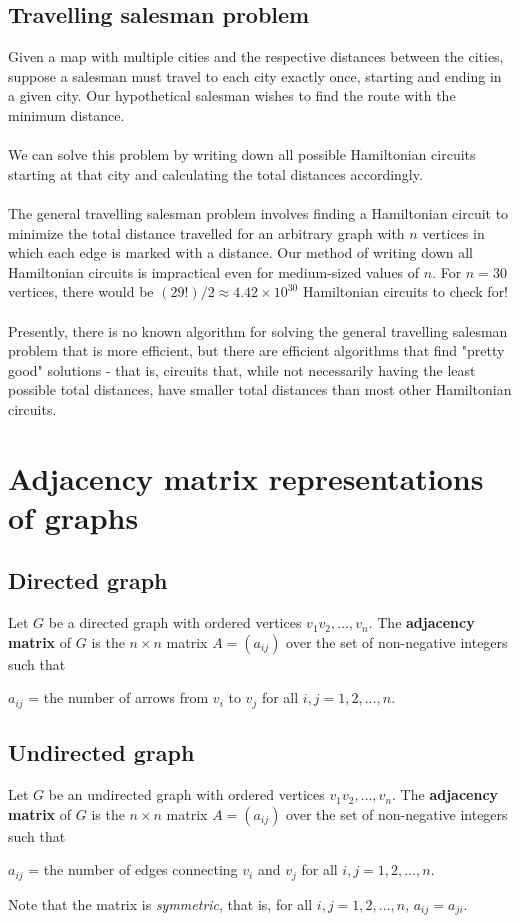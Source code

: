 \documentclass[a4paper]{article}
\begin{document}
\subsection{Travelling salesman problem}
Given a map with multiple cities and the respective distances between the cities, suppose a salesman must travel to each city exactly once, starting and ending in a given city. Our hypothetical salesman wishes to find the route with the minimum distance.\\\\
We can solve this problem by writing down all possible Hamiltonian circuits starting at that city and calculating the total distances accordingly.\\\\
The general travelling salesman problem involves finding a Hamiltonian circuit to minimize the total distance travelled for an arbitrary graph with $n$ vertices in which each edge is marked with a distance. Our method of writing down all Hamiltonian circuits is impractical even for medium-sized values of $n$. For $n=30$ vertices, there would be $(29!)/2 \approx 4.42\times10^{30}$ Hamiltonian circuits to check for!\\\\
Presently, there is no known algorithm for solving the general travelling salesman problem that is more efficient, but there are efficient algorithms that find "pretty good" solutions - that is, circuits that, while not necessarily having the least possible total distances, have smaller total distances than most other Hamiltonian circuits.

\section{Adjacency matrix representations of graphs}
\subsection{Directed graph}
Let $G$ be a directed graph with ordered vertices $v_1 v_2, \dots, v_n$. The \textbf{adjacency matrix} of $G$ is the $n\times n$ matrix $A=(a_{ij})$ over the set of non-negative integers such that
\begin{center}
	$a_{ij}$ = the number of arrows from $v_i$ to $v_j$ for all $i,j=1,2,\dots,n$.
\end{center}
\subsection{Undirected graph}
Let $G$ be an undirected graph with ordered vertices $v_1 v_2, \dots, v_n$. The \textbf{adjacency matrix} of $G$ is the $n\times n$ matrix $A=(a_{ij})$ over the set of non-negative integers such that
\begin{center}
$a_{ij}$ = the number of edges connecting $v_i$ and $v_j$ for all $i,j=1,2,\dots,n$.
\end{center}
Note that the matrix is \textit{symmetric}, that is, for all $i,j=1,2,\dots,n$, $a_{ij} = a_{ji}$.
\end{document}

